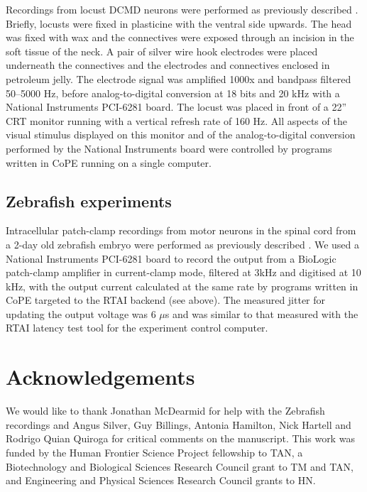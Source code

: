 Recordings from locust DCMD neurons were performed as previously
described \citep{Matheson2004}. Briefly, locusts were fixed in
plasticine with the ventral side upwards. The head was fixed with wax
and the connectives were exposed through an
incision in the soft tissue of the neck. A pair of silver wire hook
electrodes were placed underneath the connectives and the electrodes
and connectives enclosed in petroleum jelly. The electrode signal was
amplified 1000x and bandpass filtered 50--5000 Hz, before
analog-to-digital conversion at 18 bits and 20 kHz with a National
Instruments PCI-6281 board. The locust was placed in front of a 22''
CRT monitor running with a vertical refresh rate of 160 Hz. All
aspects of the visual stimulus displayed on this monitor and of
the analog-to-digital conversion performed by the National Instruments
board were controlled by programs written in 
CoPE running on a single computer.

\subsection*{Zebrafish experiments}

Intracellular patch-clamp recordings from motor neurons in the spinal
cord from a 2-day old zebrafish embryo were performed as previously
described \citep{McDearmid2006}. We used a National Instruments PCI-6281
board to
record the output from a BioLogic patch-clamp amplifier in
current-clamp mode, filtered at 3kHz and digitised at 10 kHz, with the
output current calculated at the same rate by programs written in
CoPE targeted to the RTAI backend (see
above). The measured jitter for updating the output voltage was 6
$\mu$s and was similar to that measured with the RTAI latency test
tool for the experiment control computer.

\section*{Acknowledgements} 

We would like to thank Jonathan McDearmid for help with the Zebrafish
recordings and Angus Silver, Guy Billings, Antonia Hamilton, Nick
Hartell and Rodrigo Quian Quiroga for critical comments on the
manuscript. This work was funded by the Human Frontier Science Project
fellowship to TAN, a Biotechnology and Biological Sciences Research
Council grant to TM and TAN, and Engineering and Physical Sciences Research
Council grants to HN.

